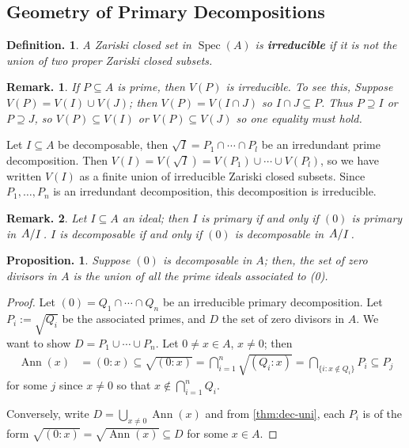 \documentclass[11pt, a4paper]{memoir}
\theoremstyle{change}
\newtheorem{proposition}[theorem]{Proposition.}
\theoremstyle{plain}
\theoremstyle{nonumberplain}
\newtheorem{definition}{Definition.}
\newtheorem{remark}{Remark.}
\newtheorem{proof}{Proof}
\DeclareMathOperator{\Ann}{Ann}
\DeclareMathOperator{\Spec}{Spec}
\newcommand{\quot}[2]{\mathchoice{\left.\raisebox{0.10em}{$#1$}\middle/\raisebox{-0.10em}{$#2$}\right.}
                                 {\left.\raisebox{0.04em}{$#1$}\middle/\raisebox{-0.04em}{$#2$}\right.}
                                 {\left.\raisebox{0.01em}{$#1$}\middle/\raisebox{-0.01em}{$#2$}\right.}
                                 {\left.\raisebox{0em}{$#1$}\middle/\raisebox{0em}{$#2$}\right.}}
\numberwithin{equation}{section}
\begin{document}
\subsection{Geometry of Primary Decompositions}
\begin{definition}
    A Zariski closed set in $\Spec(A)$ is \textbf{irreducible} if it is not the union of two proper Zariski closed subsets.
\end{definition}
\begin{remark}
    If $P\subseteq A$ is prime, then $V(P)$ is irreducible.
    To see this, Suppose $V(P)=V(I)\cup V(J)$; then $V(P)=V(I\cap J)$ so $I\cap J\subseteq P$.
    Thus $P\supseteq I$ or $P\supseteq J$, so $V(P)\subseteq V(I)$ or $V(P)\subseteq V(J)$ so one equality must hold.
\end{remark}
Let $I\subseteq A$ be decomposable, then $\sqrt{I}=P_1\cap\cdots\cap P_l$ be an irredundant prime decomposition.
Then $V(I)=V(\sqrt{I})=V(P_1)\cup\cdots\cup V(P_l)$, so we have written $V(I)$ as a finite union of irreducible Zariski closed subsets.
Since $P_1,\ldots,P_n$ is an irredundant decomposition, this decomposition is irreducible.
\begin{remark}
    Let $I\subseteq A$ an ideal; then $I$ is primary if and only if $(0)$ is primary in $\quot{A}{I}$.
    $I$ is decomposable if and only if $(0)$ is decomposable in $\quot{A}{I}$.
\end{remark}
\begin{proposition}
    Suppose $(0)$ is decomposable in $A$; then, the set of zero divisors in $A$ is the union of all the prime ideals associated to (0).
\end{proposition}
\begin{proof}
    Let $(0)=Q_1\cap\cdots\cap Q_n$ be an irreducible primary decomposition.
    Let $P_i:=\sqrt{Q_i}$ be the associated primes, and $D$ the set of zero divisors in $A$.
    We want to show $D=P_1\cup\cdots\cup P_n$.
    Let $0\neq x\in A$, $x\neq 0$; then
    \begin{align*}
        \Ann(x)&=(0:x)\subseteq\sqrt{(0:x)}= \bigcap_{i=1}^n\sqrt{(Q_i:x)}=\bigcap_{\{i:x\notin Q_i\}} P_i\subseteq P_j
    \end{align*}
    for some $j$ since $x\neq 0$ so that $x\notin\bigcap_{i=1}^n Q_i$.

    Conversely, write $D=\bigcup_{x\neq 0}\Ann(x)$ and from \cref{thm:dec-uni}, each $P_i$ is of the form $\sqrt{(0:x)}=\sqrt{\Ann(x)}\subseteq D$ for some $x\in A$.
\end{proof}
\end{document}
